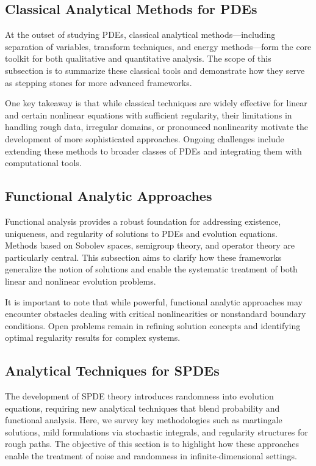 \documentclass[sigconf]{acmart}
\begin{document}
\subsection{Classical Analytical Methods for PDEs}
At the outset of studying PDEs, classical analytical methods—including separation of variables, transform techniques, and energy methods—form the core toolkit for both qualitative and quantitative analysis. The scope of this subsection is to summarize these classical tools and demonstrate how they serve as stepping stones for more advanced frameworks.

One key takeaway is that while classical techniques are widely effective for linear and certain nonlinear equations with sufficient regularity, their limitations in handling rough data, irregular domains, or pronounced nonlinearity motivate the development of more sophisticated approaches. Ongoing challenges include extending these methods to broader classes of PDEs and integrating them with computational tools.

\subsection{Functional Analytic Approaches}
Functional analysis provides a robust foundation for addressing existence, uniqueness, and regularity of solutions to PDEs and evolution equations. Methods based on Sobolev spaces, semigroup theory, and operator theory are particularly central. This subsection aims to clarify how these frameworks generalize the notion of solutions and enable the systematic treatment of both linear and nonlinear evolution problems.

It is important to note that while powerful, functional analytic approaches may encounter obstacles dealing with critical nonlinearities or nonstandard boundary conditions. Open problems remain in refining solution concepts and identifying optimal regularity results for complex systems.

\subsection{Analytical Techniques for SPDEs}
The development of SPDE theory introduces randomness into evolution equations, requiring new analytical techniques that blend probability and functional analysis. Here, we survey key methodologies such as martingale solutions, mild formulations via stochastic integrals, and regularity structures for rough paths. The objective of this section is to highlight how these approaches enable the treatment of noise and randomness in infinite-dimensional settings.
\end{document}
